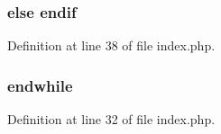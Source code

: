 \subsubsection[{endif}]{\setlength{\rightskip}{0pt plus 5cm}else endif}\label{index_8php_ab4d017bcc79cd2827c3dce8af2570e91}


Definition at line 38 of file index.\+php.

\hypertarget{index_8php_a1b05dae45f9e3f4c1fe86048550d2c5b}{}
\subsubsection[{endwhile}]{\setlength{\rightskip}{0pt plus 5cm}endwhile}\label{index_8php_a1b05dae45f9e3f4c1fe86048550d2c5b}


Definition at line 32 of file index.\+php.

